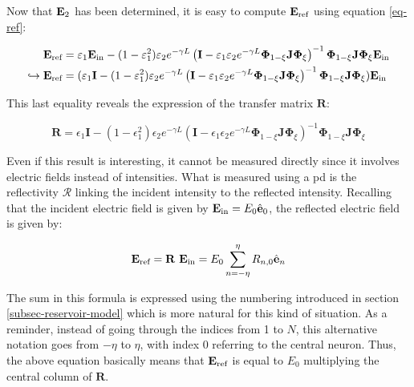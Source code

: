 Now that $\mathbf{E}_{\text{2}}$ has been determined, it is easy to compute $\mathbf{E}_{\text{ref}}$ using equation \eqref{eq-ref}:

\begin{align}
	\mathbf{E}_{\text{ref}} &= \varepsilon_1 \mathbf{E}_{\text{in}} - (1-\varepsilon_1^2) \varepsilon_2 e^{-\gamma L} \left( \mathbf{I} - \varepsilon_1 \varepsilon_2 e^{- \gamma L} \mathbf{\Phi}_{1-\xi} \mathbf{J} \mathbf{\Phi}_\xi \right)^{-1} \mathbf{\Phi}_{1-\xi} \mathbf{J} \mathbf{\Phi}_\xi \mathbf{E}_{\text{in}} \nonumber \\
	\hookrightarrow \mathbf{E}_{\text{ref}} &= (\varepsilon_1 \mathbf{I} - (1-\varepsilon_1^2) \varepsilon_2 e^{-\gamma L} \left( \mathbf{I} - \varepsilon_1 \varepsilon_2 e^{- \gamma L} \mathbf{\Phi}_{1-\xi} \mathbf{J} \mathbf{\Phi}_\xi \right)^{-1} \mathbf{\Phi}_{1-\xi} \mathbf{J} \mathbf{\Phi}_\xi) \mathbf{E}_{\text{in}}
\end{align}

This last equality reveals the expression of the transfer matrix $\mathbf{R}$:

\begin{equation}
	\boxed{\mathbf{R} = \epsilon_1 \mathbf{I} - (1-\epsilon_1^2) \epsilon_2 e^{-\gamma L} \left( \mathbf{I} - \epsilon_1 \epsilon_2 e^{- \gamma L} \mathbf{\Phi}_{1-\xi} \mathbf{J} \mathbf{\Phi}_\xi \right)^{-1} \mathbf{\Phi}_{1-\xi} \mathbf{J} \mathbf{\Phi}_\xi}
	\label{eq-tf-matrix}
\end{equation}

Even if this result is interesting, it cannot be measured directly since it involves electric fields instead of intensities. What is measured using a \gls{pd} is the reflectivity $\mathcal{R}$ linking the incident intensity to the reflected intensity. Recalling that the incident electric field is given by $\mathbf{E}_{\text{in}} = E_0 \hat{\mathbf{e}}_0$, the reflected electric field is given by:

\begin{equation}
	\mathbf{E}_{\text{ref}} = \mathbf{R}~\mathbf{E}_{\text{in}} = E_0\sum_{n=-\eta}^\eta R_{n,0} \hat{\mathbf{e}}_n
	\label{eq-reflected-vector}
\end{equation}

The sum in this formula is expressed using the numbering introduced in section \ref{subsec-reservoir-model} which is more natural for this kind of situation. As a reminder, instead of going through the indices from 1 to $N$, this alternative notation goes from $-\eta$ to $\eta$, with index 0 referring to the central neuron. Thus, the above equation basically means that $\mathbf{E}_{\text{ref}}$ is equal to $E_0$ multiplying the central column of $\mathbf{R}$.\\

